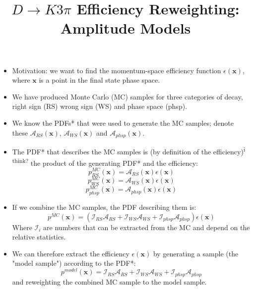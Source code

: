 \documentclass{article}
\title{$D\rightarrow K3\pi$ Efficiency Reweighting: Amplitude Models}
\begin{document}
\maketitle
\begin{itemize}
    \item Motivation: we want to find the momentum-space efficiency function $\epsilon(\mathbf{x})$,
          where $\mathbf{x}$ is a point in the final state phase space.
    \item We have produced Monte Carlo (MC) samples for three categories of decay, right sign (RS) wrong sign (WS) and phase space (phsp).
    \item We know the PDFs* that were used to generate the MC samples; denote these
          $\mathcal{A}_{RS}(\mathbf{x})$, $\mathcal{A}_{WS}(\mathbf{x})$ and $\mathcal{A}_{phsp}(\mathbf{x})$.
    \item The PDF* that describes the MC samples is (by definition of the efficiency)\textsuperscript{i think?} the product of the generating PDF* and the efficiency:
          \begin{equation*}
              p^{MC}_{RS}(\mathbf{x}) = \mathcal{A}_{RS}(\mathbf{x})\epsilon(\mathbf{x})
          \end{equation*}
          \begin{equation}
              p^{MC}_{WS}(\mathbf{x}) = \mathcal{A}_{WS}(\mathbf{x})\epsilon(\mathbf{x})
          \end{equation}
          \begin{equation*}
              p^{MC}_{phsp}(\mathbf{x}) = \mathcal{A}_{phsp}(\mathbf{x})\epsilon(\mathbf{x})
          \end{equation*}
    \item If we combine the MC samples, the PDF describing them is:
          \begin{equation}
              p^{MC}(\mathbf{x}) = (\mathcal{I}_{RS}\mathcal{A}_{RS}
              + \mathcal{I}_{WS}\mathcal{A}_{WS}
              + \mathcal{I}_{phsp}\mathcal{A}_{phsp})\epsilon(\mathbf{x})
          \end{equation}
          Where $\mathcal{I}_{i}$ are numbers that can be extracted from the MC and depend on the relative statistics.
    \item We can therefore extract the efficiency $\epsilon(\mathbf{x})$ by generating a sample (the "model sample") according to the PDF*:
          \begin{equation}
              p^{model}(\mathbf{x}) = \mathcal{I}_{RS}\mathcal{A}_{RS}
              + \mathcal{I}_{WS}\mathcal{A}_{WS}
              + \mathcal{I}_{phsp}\mathcal{A}_{phsp}
          \end{equation}
          and reweighting the combined MC sample to the model sample.
\end{itemize}
\end{document}
